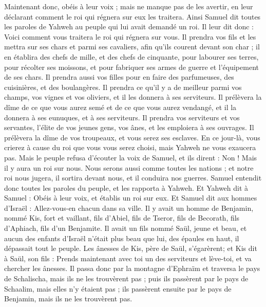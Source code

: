 \begin{multicols}{2}
Maintenant donc, obéis à leur voix ; mais ne manque pas de les avertir, en leur déclarant comment le roi qui régnera sur eux les traitera.
Ainsi Samuel dit toutes les paroles de Yahweh au peuple qui lui avait demandé un roi.
Il leur dit donc : Voici comment vous traitera le roi qui régnera sur vous. Il prendra vos fils et les mettra sur ses chars et parmi ses cavaliers, afin qu'ils courent devant son char ;
il en établira des chefs de mille, et des chefs de cinquante, pour labourer ses terres, pour récolter ses moissons, et pour fabriquer ses armes de guerre et l'équipement de ses chars.
Il prendra aussi vos filles pour en faire des parfumeuses, des cuisinières, et des boulangères.
Il prendra ce qu'il y a de meilleur parmi vos champs, vos vignes et vos oliviers, et il les donnera à ses serviteurs.
Il prélèvera la dîme de ce que vous aurez semé et de ce que vous aurez vendangé, et il la donnera à ses eunuques, et à ses serviteurs.
Il prendra vos serviteurs et vos servantes, l'élite de vos jeunes gens, vos ânes, et les emploiera à ses ouvrages.
Il prélèvera la dîme de vos troupeaux, et vous serez ses esclaves.
En ce jour-là, vous crierez à cause du roi que vous vous serez choisi, mais Yahweh ne vous exaucera pas.
Mais le peuple refusa d'écouter la voix de Samuel, et ils dirent : Non ! Mais il y aura un roi sur nous.
Nous serons aussi comme toutes les nations ; et notre roi nous jugera, il sortira devant nous, et il conduira nos guerres.
Samuel entendit donc toutes les paroles du peuple, et les rapporta à Yahweh.
Et Yahweh dit à Samuel : Obéis à leur voix, et établis un roi sur eux. Et Samuel dit aux hommes d'Israël : Allez-vous-en chacun dans sa ville.
\VerseOne{}Il y avait un homme de Benjamin, nommé Kis, fort et vaillant, fils d'Abiel, fils de Tseror, fils de Becorath, fils d'Aphiach, fils d'un Benjamite.
Il avait un fils nommé Saül, jeune et beau, et aucun des enfants d'Israël n'était plus beau que lui, des épaules en haut, il dépassait tout le peuple.
Les ânesses de Kis, père de Saül, s'égarèrent; et Kis dit à Saül, son fils : Prends maintenant avec toi un des serviteurs et lève-toi, et va chercher les ânesses.
Il passa donc par la montagne d'Ephraïm et traversa le pays de Schalischa, mais ils ne les trouvèrent pas ; puis ils passèrent par le pays de Schaalim, mais elles n'y étaient pas ; ils passèrent ensuite par le pays de Benjamin, mais ils ne les trouvèrent pas.

\end{multicols}
